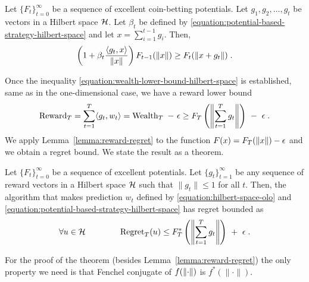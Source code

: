 \begin{lemma}
Let $\{F_t\}_{t=0}^\infty$ be a sequence of excellent coin-betting potentials.
Let $g_1, g_2, \dots, g_t$ be vectors in a Hilbert space $\mathcal{H}$. Let $\beta_t$
be defined by \eqref{equation:potential-based-strategy-hilbert-space}
and let $x = \sum_{i=1}^{t-1} g_i$. Then,
$$
\left(1 + \beta_t \frac{\langle g_t, x \rangle}{\|x\|} \right) F_{t-1}(\left\|{x}\right\|)
\ge F_t(\left\|{x + g_t}\right\|) \; .
$$
\end{lemma}

Once the inequality \eqref{equation:wealth-lower-bound-hilbert-space} is
established, same as in the one-dimensional case, we have a reward lower bound
\begin{equation}
\label{equation:hilbert-space-olo-reward-lower-bound}
\operatorname{Reward}_T
= \sum_{t=1}^T \langle g_t, w_t \rangle
= \operatorname{Wealth}_T \ - \ \epsilon
\ge F_T\left(\left\|{\sum_{t=1}^T g_t}\right\| \right) \ - \ \epsilon \; .
\end{equation}
We apply Lemma~\ref{lemma:reward-regret} to the function $F(x) = F_T(\left\|{x}\right\|) -
\epsilon$ and we obtain a regret bound. We state the result as a theorem.

\begin{theorem}
Let $\{F_t\}_{t=0}^\infty$ be a sequence of excellent potentials. Let
$\{g_t\}_{t=1}^\infty$ be any sequence of reward vectors in a Hilbert space $\mathcal{H}$
such that $\|g_t\| \le 1$ for all $t$. Then, the algorithm that makes prediction
$w_t$ defined by \eqref{equation:hilbert-space-olo} and
\eqref{equation:potential-based-strategy-hilbert-space} has regret bounded as
$$
\forall u \in \H \qquad \qquad
\Regret_T(u) \le F_T^*\left(\norm{\sum_{t=1}^T g_t} \right) \ + \ \epsilon \; .
$$
\end{theorem}

For the proof of the theorem (besides Lemma~\ref{lemma:reward-regret})
the only property we need is that Fenchel conjugate of $f(\left\|{\cdot}\right\|)$
is $f^*(\|\cdot\|)$.
